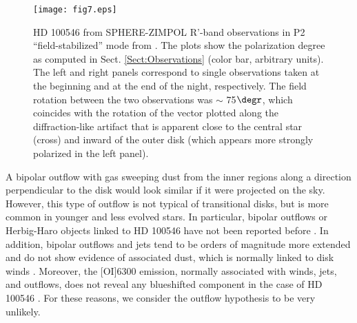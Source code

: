 \documentclass{aa}
\begin{document}
\begin{figure}
\centering
 \texttt{[image: fig7.eps]}
\caption{HD 100546 from SPHERE-ZIMPOL R'-band observations in P2 ``field-stabilized'' mode from \citet{Garufi16}. The plots show the polarization degree as computed in Sect. \ref{Sect:Observations} (color bar, arbitrary units). The left and right panels correspond to single observations taken at the beginning and at the end of the night, respectively. The field rotation between the two observations was $\sim$ 75$\degr$, which coincides with the rotation of the vector plotted along the diffraction-like artifact that is apparent close to the central star (cross) and inward of the outer disk (which appears more strongly polarized in the left panel).} 
\label{Figure:garufi}
\end{figure} 

A bipolar outflow with gas sweeping dust from the inner regions along a direction perpendicular to the disk would look similar if it were projected on the sky. However, this type of outflow
is not typical of transitional disks, but is more common in younger
and less evolved stars. In particular, bipolar outflows or Herbig-Haro objects linked to HD 100546 have not been reported before \citep[see, e.g.,][and references therein]{Dent13}. In addition, bipolar outflows and jets tend to be orders of magnitude more extended and do not show evidence of associated dust, which is normally linked to disk winds \citep[see, e.g., the case of the Herbig Ae/Be star HD 163296 in][]{Ellerbroek14}. Moreover, the [OI]6300 emission, normally associated with winds, jets, and outflows, does not reveal any blueshifted component in the case of HD 100546 \citep{Acke05,Acke06}. For these reasons, we consider the outflow hypothesis to be very unlikely.   
\end{document}
